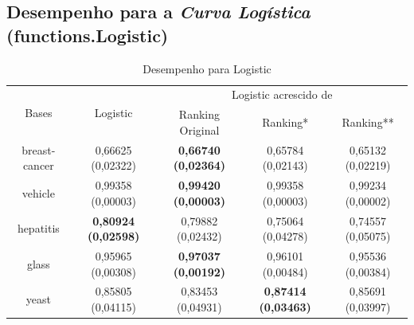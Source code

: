 \clearpage
\pagebreak


\subsection{Desempenho para a \emph{Curva Logística} (functions.Logistic)}

\begin{table}[h!]
    \begin{tabular}{ c c c c c }
        \hline

        \multirow{2}{*}{Bases} & \multirow{2}{*}{Logistic} & \multicolumn{3}{c}{Logistic acrescido de} \\ \cline{3-5}
        & & {\small Ranking Original} & {\small Ranking*} & {\small  Ranking**} \\
        
        \hline
        
        breast-cancer & {\small 0,66625 (0,02322)} & {\small \textbf{0,66740 (0,02364)}} & {\small 0,65784 (0,02143)} & {\small 0,65132 (0,02219)} \\
        vehicle & {\small 0,99358 (0,00003)} & {\small \textbf{0,99420 (0,00003)}} & {\small 0,99358 (0,00003)} & {\small 0,99234 (0,00002)} \\
        hepatitis & {\small \textbf{0,80924 (0,02598)}} & {\small 0,79882 (0,02432)} & {\small 0,75064 (0,04278)} & {\small 0,74557 (0,05075)} \\
        glass & {\small 0,95965 (0,00308)} & {\small \textbf{0,97037 (0,00192)}} & {\small 0,96101 (0,00484)} & {\small 0,95536 (0,00384)} \\
        yeast & 0{\small ,85805 (0,04115)} & {\small 0,83453 (0,04931)} & {\small \textbf{0,87414 (0,03463)}} & {\small 0,85691 (0,03997)} \\
    
        \hline
    \end{tabular}
    
    \caption{Desempenho para Logistic}
    \label{logistic_results_table}
\end{table}


